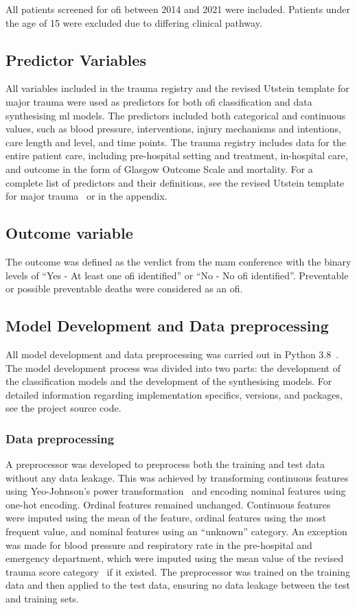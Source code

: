 \documentclass[12pt, a4paper]{article}
\begin{document}
All patients screened for \acrshort{ofi} between 2014 and 2021 were included. Patients under the age of 15 were
excluded due to differing clinical pathway.

\subsection{Predictor Variables}
All variables included in the trauma registry and the revised Utstein template for major trauma were used as predictors
for both \acrshort{ofi} classification and data synthesising \acrshort{ml} models. The predictors included both
categorical and continuous values, such as blood pressure, interventions, injury mechanisms and intentions, care length
and level, and time points. The trauma registry includes data for the entire patient care, including pre-hospital
setting and treatment, in-hospital care, and outcome in the form of Glasgow Outcome Scale and mortality. For a complete
list of predictors and their definitions, see the revised Utstein template for major trauma~\cite{ringdal_utstein_2008}
or  in the appendix.

\subsection{Outcome variable}
The outcome was defined as the verdict from the \acrshort{mam} conference with the binary levels of ``Yes - At least
one \acrshort{ofi} identified'' or ``No - No \acrshort{ofi} identified''. Preventable or possible preventable deaths
were considered as an \acrshort{ofi}.

\subsection{Model Development and Data preprocessing}
All model development and data preprocessing was carried out in Python 3.8~\cite{python_2009}. The model development
process was divided into two parts: the development of the classification models and the development of the
synthesising models. For detailed information regarding implementation specifics, versions, and packages, see the
project source code.

\subsubsection*{Data preprocessing}
A preprocessor was developed to preprocess both the training and test data without any data leakage. This was achieved
by transforming continuous features using Yeo-Johnson's power transformation~\cite{yeo_new_2000} and encoding nominal
features using one-hot encoding. Ordinal features remained unchanged. Continuous features were imputed using the mean
of the feature, ordinal features using the most frequent value, and nominal features using an ``unknown'' category. An
exception was made for blood pressure and respiratory rate in the pre-hospital and emergency department, which were
imputed using the mean value of the revised trauma score category~\cite{ringdal_utstein_2008} if it existed. The
preprocessor was trained on the training data and then applied to the test data, ensuring no data leakage between the
test and training sets.
\end{document}
